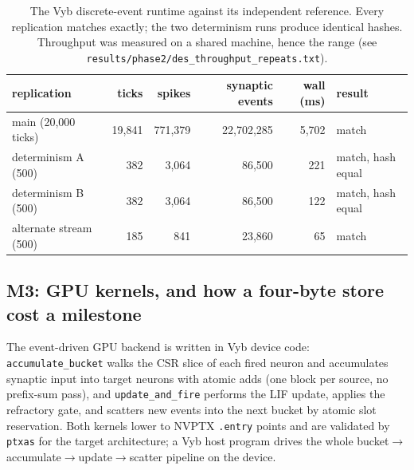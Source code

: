 \documentclass[11pt,a4paper]{article}
\newcommand{\code}[1]{\texttt{\footnotesize #1}}
\begin{document}
\begin{table}[t]
\centering
\caption{The Vyb discrete-event runtime against its independent reference. Every replication
matches exactly; the two determinism runs produce identical hashes. Throughput was measured on a
shared machine, hence the range (see \code{results/phase2/des\_throughput\_repeats.txt}).}
\label{tab:des}
\begin{tabular}{l r r r r l}
\toprule
replication & ticks & spikes & synaptic events & wall (ms) & result \\
\midrule
main (20{,}000 ticks) & 19{,}841 & 771{,}379 & 22{,}702{,}285 & 5{,}702 & match \\
determinism A (500)   & 382 & 3{,}064 & 86{,}500 & 221 & match, hash equal \\
determinism B (500)   & 382 & 3{,}064 & 86{,}500 & 122 & match, hash equal \\
alternate stream (500) & 185 & 841 & 23{,}860 & 65 & match \\
\bottomrule
\end{tabular}
\end{table}

\subsection{M3: GPU kernels, and how a four-byte store cost a milestone}
\label{sec:gpu-fix}
The event-driven GPU backend is written in Vyb device code: \code{accumulate\_bucket} walks the
CSR slice of each fired neuron and accumulates synaptic input into target neurons with atomic
adds (one block per source, no prefix-sum pass), and \code{update\_and\_fire} performs the LIF
update, applies the refractory gate, and scatters new events into the next bucket by atomic slot
reservation. Both kernels lower to NVPTX \code{.entry} points and are validated by \code{ptxas}
for the target architecture; a Vyb host program drives the whole
bucket$\to$accumulate$\to$update$\to$scatter pipeline on the device.
\end{document}
